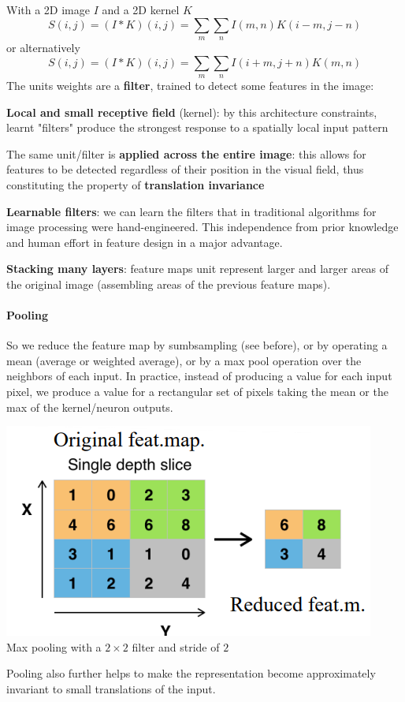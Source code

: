 \documentclass[10pt]{report}
\begin{document}
With a 2D image $I$ and a 2D kernel $K$ $$S(i,j) = (I*K)(i,j)=\sum_m\sum_n I(m,n)K(i-m,j-n)$$ or alternatively $$S(i,j) = (I*K)(i,j)=\sum_m\sum_n I(i+m,j+n)K(m,n)$$
The units weights are a \textbf{filter}, trained to detect some features in the image:
\begin{list}{}{}
	\item \textbf{Local and small receptive field} (kernel): by this architecture constraints, learnt "filters" produce the strongest response to a spatially local input pattern
	\item The same unit/filter is \textbf{applied across the entire image}: this allows for features to be detected regardless of their position in the visual field, thus constituting the property of \textbf{translation invariance}
	\item \textbf{Learnable filters}: we can learn the filters that in traditional algorithms for image processing were hand-engineered. This independence from prior knowledge and human effort in feature design in a major advantage.
	\item \textbf{Stacking many layers}: feature maps unit represent larger and larger areas of the original image (assembling areas of the previous feature maps).
\end{list}
\paragraph{Pooling} So we reduce the feature map by sumbsampling (see before), or by operating a mean (average or weighted average), or by a max pool operation over the neighbors of each input. In practice, instead of producing a value for each input pixel, we produce a value for a rectangular set of pixels taking the mean or the max of the kernel/neuron outputs.
\begin{center}
	\includegraphics[scale=0.5]{29.png}\\
	Max pooling with a $2\times2$ filter and stride of $2$
\end{center}
Pooling also further helps to make the representation become approximately invariant to small translations of the input.
\end{document}
